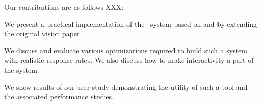 Our contributions are as follows XXX:
\begin{denselist}
  \item We present a practical implementation of the \SeeDB\ system based on and
  by extending the original vision paper \cite{DBLP:conf/vldb/Parameswaran2013}.
  \item We discuss and evaluate various optimizations required to build such a
  system with realistic response rates. We also discuss how to make
  interactivity a part of the system.
  \item We show results of our user study demonstrating the utility of such a
  tool and the associated performance studies.
\end{denselist}


% 
% 
% 
% 
% 
